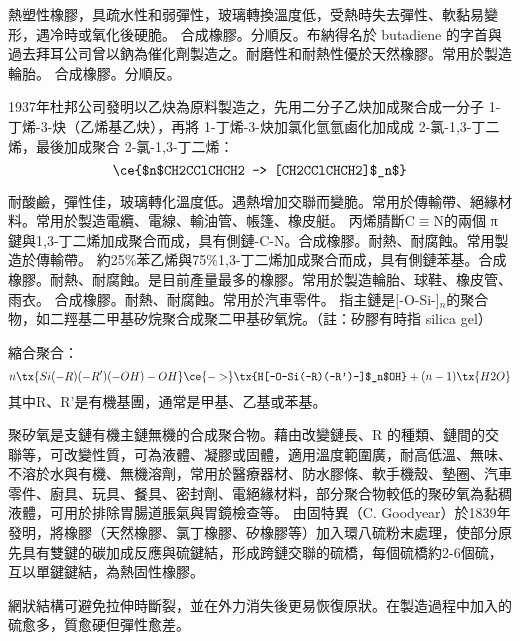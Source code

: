 \documentclass[a4paper,12pt]{report}
\begin{document}
\begin{itemize}
\begin{itemize}
熱塑性橡膠，具疏水性和弱彈性，玻璃轉換溫度低，受熱時失去彈性、軟黏易變形，遇冷時或氧化後硬脆。
合成橡膠。分順反。布納得名於 butadiene 的字首與過去拜耳公司曾以鈉為催化劑製造之。耐磨性和耐熱性優於天然橡膠。常用於製造輪胎。
合成橡膠。分順反。

1937年杜邦公司發明以乙炔為原料製造之，先用二分子乙炔加成聚合成一分子 1-丁烯-3-炔（乙烯基乙炔），再將 1-丁烯-3-炔加氯化氫氫鹵化加成成 2-氯-1,3-丁二烯，最後加成聚合 2-氯-1,3-丁二烯：
\[\ce{$n$CH2CClCHCH2 -> [CH2CClCHCH2]$_n$}\]

耐酸鹼，彈性佳，玻璃轉化溫度低。遇熱增加交聯而變脆。常用於傳輸帶、絕緣材料。常用於製造電纜、電線、輸油管、帳篷、橡皮艇。
丙烯腈斷C$\equiv$N的兩個 π 鍵與1,3-丁二烯加成聚合而成，具有側鏈-C-N。合成橡膠。耐熱、耐腐蝕。常用製造於傳輸帶。
約25\%苯乙烯與75\%1,3-丁二烯加成聚合而成，具有側鏈苯基。合成橡膠。耐熱、耐腐蝕。是目前產量最多的橡膠。常用於製造輪胎、球鞋、橡皮管、雨衣。
合成橡膠。耐熱、耐腐蝕。常用於汽車零件。
指主鏈是[-O-Si-]$_n$的聚合物，如二羥基二甲基矽烷聚合成聚二甲基矽氧烷。（註：矽膠有時指 silica gel）

縮合聚合：
\[n\tx{Si(-R)(-R')(-OH)-OH} \ce{->} \tx{H[-O-Si(-R)(-R')-]$_n$OH} + (n-1)\tx{H2O}\]
其中R、R'是有機基團，通常是甲基、乙基或苯基。

聚矽氧是支鏈有機主鏈無機的合成聚合物。藉由改變鏈長、R 的種類、鏈間的交聯等，可改變性質，可為液體、凝膠或固體，適用溫度範圍廣，耐高低溫、無味、不溶於水與有機、無機溶劑，常用於醫療器材、防水膠條、軟手機殼、墊圈、汽車零件、廚具、玩具、餐具、密封劑、電絕緣材料，部分聚合物較低的聚矽氧為黏稠液體，可用於排除胃腸道脹氣與胃鏡檢查等。
由固特異（C. Goodyear）於1839年發明，將橡膠（天然橡膠、氯丁橡膠、矽橡膠等）加入環八硫粉末處理，使部分原先具有雙鍵的碳加成反應與硫鍵結，形成跨鏈交聯的硫橋，每個硫橋約2-6個硫，互以單鍵鍵結，為熱固性橡膠。

網狀結構可避免拉伸時斷裂，並在外力消失後更易恢復原狀。在製造過程中加入的硫愈多，質愈硬但彈性愈差。


\end{itemize}
\end{itemize}
\end{document}
